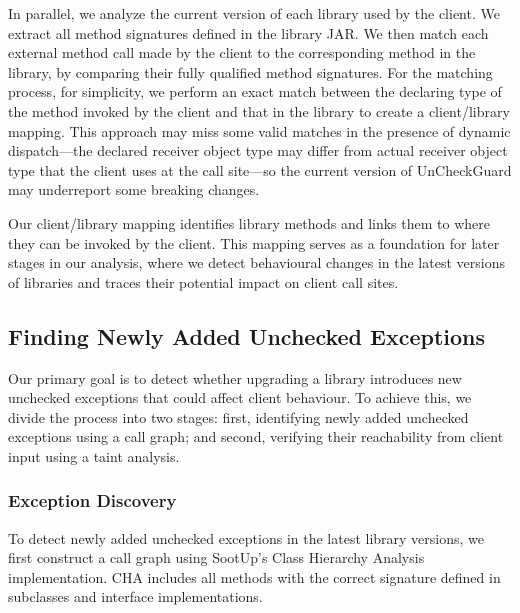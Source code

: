 In parallel, we analyze the current version of each library used by the client. We extract all method signatures defined in the library JAR. We then match each external method call made by the client to the corresponding method in the library, by comparing their fully qualified method signatures. For the matching process, for simplicity, we perform an exact match between the declaring type of the method invoked by the client and that in the library to create a client/library mapping. This approach may miss some valid matches in the presence of dynamic dispatch---the declared receiver object type may differ from actual receiver object type that the client uses at the call site---so the current version of UnCheckGuard may underreport some breaking changes.

Our client/library mapping identifies library methods and links them to where they can be invoked by the client. This mapping serves as a foundation for later stages in our analysis, where we detect behavioural changes in the latest versions of libraries and traces their potential impact on client call sites.

\subsection{Finding Newly Added Unchecked Exceptions}

Our primary goal is to detect whether upgrading a library introduces new unchecked exceptions that could affect client behaviour. To achieve this, we divide the process into two stages: first, identifying newly added unchecked exceptions using a call graph; and second, verifying their reachability from client input using a taint analysis.

\subsubsection{Exception Discovery}

To detect newly added unchecked exceptions in the latest library versions, we first construct a call graph using SootUp's Class Hierarchy Analysis implementation. CHA includes all methods with the correct signature defined in subclasses and interface implementations.


